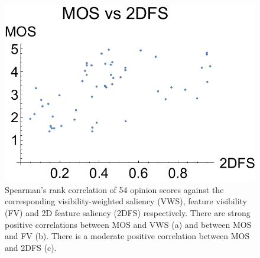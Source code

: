 \begin{figure}
\begin{minipage}{.33\textwidth}
	\end{minipage}~
	\begin{minipage}{.33\textwidth}
		\includegraphics[width=1\linewidth]{figures/mos_vs_2dfs}
	\end{minipage}
	\caption[Spearman's rank correlation of 54 opinion scores against the corresponding VWS, FV and 2DFS respectively]{Spearman's rank correlation of 54 opinion scores against the corresponding visibility-weighted saliency (VWS), feature visibility (FV) and 2D feature saliency (2DFS) respectively. There are strong positive correlations between MOS and VWS (a) and between MOS and FV (b). There is a moderate positive correlation between MOS and 2DFS (c).}
	\label{fig:mos_vs_vws}
\end{figure}

